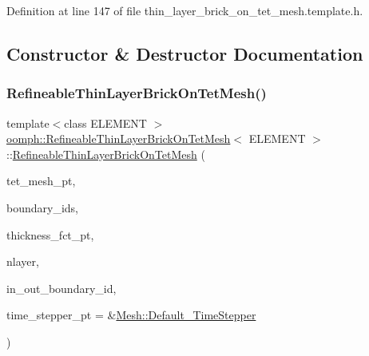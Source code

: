 Definition at line 147 of file thin\+\_\+layer\+\_\+brick\+\_\+on\+\_\+tet\+\_\+mesh.\+template.\+h.



\subsection{Constructor \& Destructor Documentation}
\mbox{\label{classoomph_1_1RefineableThinLayerBrickOnTetMesh_a3f1a8807362ae98ae73bbf577e858e51}} 
\subsubsection{\texorpdfstring{Refineable\+Thin\+Layer\+Brick\+On\+Tet\+Mesh()}{RefineableThinLayerBrickOnTetMesh()}}
{\footnotesize\ttfamily template$<$class E\+L\+E\+M\+E\+NT $>$ \\
\hyperlink{classoomph_1_1RefineableThinLayerBrickOnTetMesh}{oomph\+::\+Refineable\+Thin\+Layer\+Brick\+On\+Tet\+Mesh}$<$ E\+L\+E\+M\+E\+NT $>$\+::\hyperlink{classoomph_1_1RefineableThinLayerBrickOnTetMesh}{Refineable\+Thin\+Layer\+Brick\+On\+Tet\+Mesh} (\begin{DoxyParamCaption}\item[{\hyperlink{classoomph_1_1Mesh}{Mesh} $\ast$}]{tet\+\_\+mesh\+\_\+pt,  }\item[{const \hyperlink{classoomph_1_1Vector}{Vector}$<$ unsigned $>$ \&}]{boundary\+\_\+ids,  }\item[{\hyperlink{classoomph_1_1RefineableThinLayerBrickOnTetMesh_a744583cb70486874441d5a748f23168d}{Thickness\+Fct\+Pt}}]{thickness\+\_\+fct\+\_\+pt,  }\item[{const unsigned \&}]{nlayer,  }\item[{const \hyperlink{classoomph_1_1Vector}{Vector}$<$ \hyperlink{classoomph_1_1Vector}{Vector}$<$ unsigned $>$ $>$ \&}]{in\+\_\+out\+\_\+boundary\+\_\+id,  }\item[{\hyperlink{classoomph_1_1TimeStepper}{Time\+Stepper} $\ast$}]{time\+\_\+stepper\+\_\+pt = {\ttfamily \&\hyperlink{classoomph_1_1Mesh_a12243d0fee2b1fcee729ee5a4777ea10}{Mesh\+::\+Default\+\_\+\+Time\+Stepper}} }\end{DoxyParamCaption})\hspace{0.3cm}{\ttfamily [inline]}}



